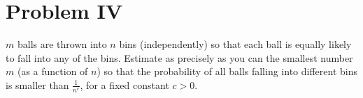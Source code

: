 \section{Problem IV}
$m$ balls are thrown into $n$ bins (independently) so that each ball is equally likely to fall into any of the bins. Estimate as precisely as you can the smallest number $m$ (as a function of $n$) so that the probability of all balls falling into different bins is smaller than $\frac{1}{n^{c}}$, for a fixed constant $c>0$.